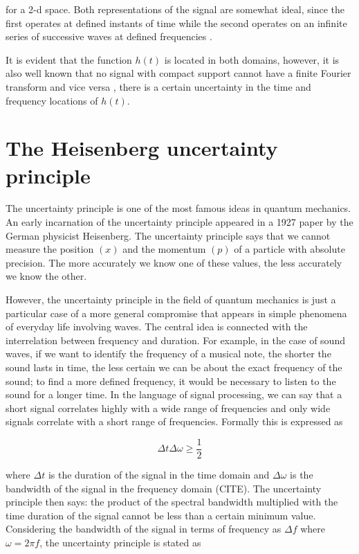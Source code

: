 for a 2-d space. Both representations of the signal are somewhat ideal, since the first operates at defined instants of time while the second operates on an infinite series of successive waves at defined frequencies \cite{Gabor:JIEE:1946a}. 

It is evident that the function $h(t)$ is located in both domains, however, it is also well known that no signal with compact support cannot have a finite Fourier transform and vice versa \cite{Bracewell:FourierBook:1999}, there is a certain uncertainty in the time and frequency locations of $h(t)$.

\section{The Heisenberg uncertainty principle }

The uncertainty principle is one of the most famous ideas in quantum mechanics. An early incarnation of the uncertainty principle appeared in a 1927 paper by the German physicist Heisenberg. The uncertainty principle says that we cannot measure the position $(x)$ and the momentum $(p)$ of a particle with absolute precision. The more accurately we know one of these values, the less accurately we know the other. 

However, the uncertainty principle in the field of quantum mechanics is just a particular case of a more general compromise that appears in simple phenomena of everyday life involving waves. The central idea is connected with the interrelation between frequency and duration. For example, in the case of sound waves, if we want to identify the frequency of a musical note, the shorter the sound lasts in time, the less certain we can be about the exact frequency of the sound; to find a more defined frequency, it would be necessary to listen to the sound for a longer time. In the language of signal processing, we can say that a short signal correlates highly with a wide range of frequencies and only wide signals correlate with a short range of frequencies. Formally this is expressed as

\begin{equation}\label{eq:uncertainty_principle_rad}
	\Delta t\Delta \omega \geq \frac{1}{2}
\end{equation}

where $\Delta t$ is the duration of the signal in the time domain and $\Delta \omega$ is the bandwidth of the signal in the frequency domain (CITE). The uncertainty principle then says: the product of the spectral bandwidth multiplied with the time duration of the signal cannot be less than a certain minimum value. Considering the bandwidth of the signal in terms of frequency as $\Delta f$ where $\omega = 2\pi f$, the uncertainty principle is stated as 

